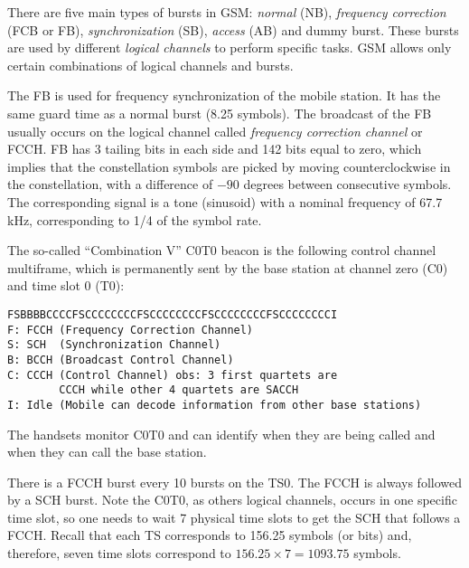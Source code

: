 
There are five main types of bursts in GSM: \emph{normal} (NB), \emph{frequency correction} (FCB or FB), \emph{synchronization} (SB), \emph{access} (AB) and dummy burst.
These bursts are used by different \emph{logical channels} to perform specific
tasks. GSM allows only certain combinations of logical channels and bursts.

The FB is used for frequency synchronization of the mobile station. 
It has the same guard time as a normal burst (8.25 symbols). The broadcast of the FB usually occurs on  the logical channel called \emph{frequency correction channel} or FCCH. FB has 3 tailing bits in each side and 142 bits equal to zero, which implies that the constellation symbols are picked by moving counterclockwise in the constellation, with a difference of $-90$ degrees between consecutive symbols.
The corresponding signal is a tone (sinusoid) with a nominal frequency of 67.7 kHz, corresponding to 1/4 of the symbol rate.

The so-called ``Combination V'' C0T0 beacon is the following control channel multiframe, which is permanently sent by the base station at channel zero (C0) and time slot 0 (T0):
\begin{verbatim}
FSBBBBCCCCFSCCCCCCCCFSCCCCCCCCFSCCCCCCCCFSCCCCCCCCI
F: FCCH (Frequency Correction Channel)
S: SCH  (Synchronization Channel)
B: BCCH (Broadcast Control Channel)
C: CCCH (Control Channel) obs: 3 first quartets are
        CCCH while other 4 quartets are SACCH
I: Idle (Mobile can decode information from other base stations)
\end{verbatim}
The handsets monitor C0T0 and can identify when they are being called and when they can call the base station.

There is a FCCH burst every 10 bursts on the TS0. The FCCH is always followed by a SCH burst. Note the C0T0, as others logical channels, occurs in one specific time slot, so one needs to wait 7 physical time slots to get the SCH that follows a FCCH. Recall that each TS corresponds to 156.25 symbols (or bits) and, therefore, seven time slots correspond to $156.25 \times 7 = 1093.75$ symbols.

